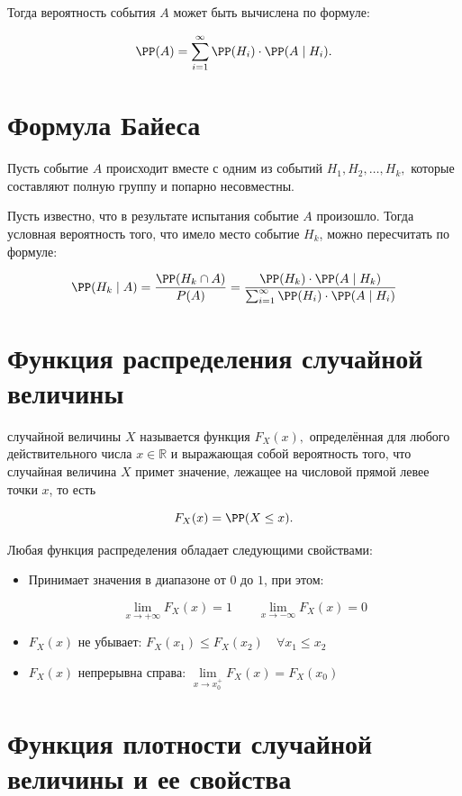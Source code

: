 \documentclass[12pt, a4paper, oneside]{article}
\begin{document}
Тогда вероятность события $A$ может быть вычислена по формуле:

$$
\PP(A) = \sum_{i=1}^{\infty} \PP(H_i) \cdot \PP(A \mid H_i).
$$


\section{Формула Байеса}

Пусть событие $A$ происходит вместе с одним из событий $H_1, H_2, \ldots, H_k,$ которые составляют полную группу и попарно несовместны. 

Пусть известно, что в результате испытания событие $A$ произошло. Тогда условная вероятность того, что имело место событие $H_k$, можно пересчитать по формуле:

$$
\PP(H_k \mid A) = \dfrac{\PP(H_k \cap A)}{P(A)} = \dfrac{\PP(H_k) \cdot \PP(A \mid H_k)}{\sum_{i=1}^{\infty} \PP(H_i) \cdot \PP(A \mid H_i)}
$$

\newpage

\section{Функция распределения случайной величины}

 случайной величины $X$ называется функция $F_X(x),$ определённая для любого действительного числа $x \in \mathbb{R}$ и выражающая собой  вероятность того, что случайная величина $X$ примет значение, лежащее на числовой прямой левее точки $x$, то есть

$$
F_X(x) = \PP(X \leq  x).
$$

Любая функция распределения обладает следующими свойствами:

\begin{itemize}
\item Принимает значения в диапазоне от $0$ до $1$, при этом:  

$$
\lim_{x \to +\infty} F_X(x)=1 \qquad \lim_{x \to -\infty} F_X(x) = 0
$$

\item $F_X(x)$ не убывает: $F_X(x_1) \leq F_X(x_2) \quad \forall x_1 \leq x_2$

\item $F_X(x)$ непрерывна справа: $\lim\limits_{x \to x_0^+} F_X(x) = F_X(x_0)$
\end{itemize}

\section{Функция плотности случайной величины и ее свойства}
\end{document}
